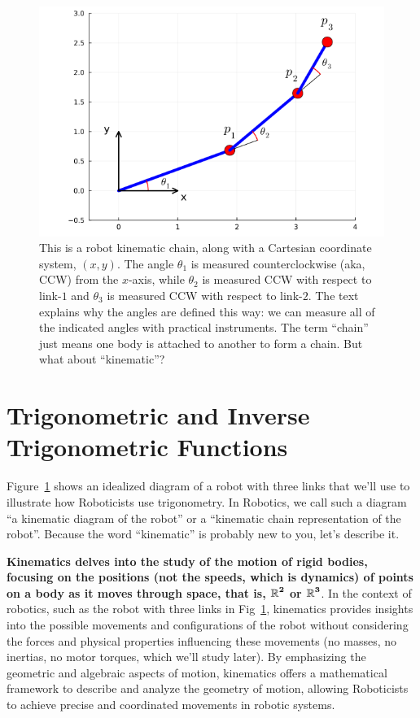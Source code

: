 \vspace*{1cm}
\begin{figure}[htb]%
\centering
\includegraphics[width=0.70\columnwidth]{graphics/Chap01/robotKinematicChain.png}%
\caption[]{This is a robot kinematic chain, along with a Cartesian coordinate system, $(x, y)$. The angle $\theta_1$ is measured counterclockwise (aka, CCW) from the $x$-axis, while $\theta_2$ is measured CCW with respect to link-$1$ and $\theta_3$ is measured CCW with respect to link-$2$. The text explains why the angles are defined this way: we can measure all of the indicated angles with practical instruments. The term ``chain'' just means one body is attached to another to form a chain. But what about ``kinematic''?}
    \label{fig:robotKinematicChain}
\end{figure}




\section{Trigonometric and Inverse Trigonometric Functions}

Figure~\ref{fig:robotKinematicChain} shows an idealized diagram of a robot with three links that we'll use to illustrate how Roboticists use trigonometry. In Robotics, we call such a diagram ``a kinematic diagram of the robot'' or a ``kinematic chain representation of the robot''. Because the word ``kinematic'' is probably new to you, let's describe it. 

\textbf{Kinematics delves into the study of the motion of rigid bodies, focusing on the positions (not the speeds, which is dynamics) of points on a body as it moves through space, that is, $\bm{\mathbb R^2}$ or $\bm{\mathbb R^3}$}. In the context of robotics, such as the robot with three links in Fig~\ref{fig:robotKinematicChain}, kinematics provides insights into the possible movements and configurations of the robot without considering the forces and physical properties influencing these movements (no masses, no inertias, no motor torques, which we'll study later). By emphasizing the geometric and algebraic aspects of motion, kinematics offers a mathematical framework to describe and analyze the geometry of motion, allowing Roboticists to achieve precise and coordinated movements in robotic systems.



